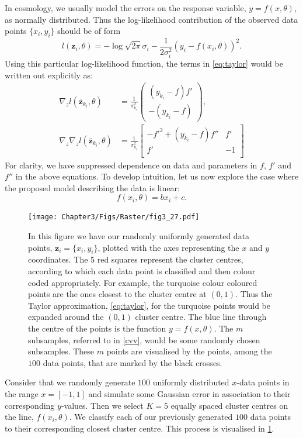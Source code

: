 In cosmology, we usually model the errors on the response variable, $y= f(x,\theta)$, as normally distributed. Thus the log-likelihood contribution of the observed data points $\{x_i,y_i \}$ should be of form
%
\begin{equation}
   l (\textbf{z}_{i},\theta) = - \log \sqrt{2\pi} \sigma_i -\frac{1}{2\sigma_i^2}(y_i-f(x_i, \theta))^2.
\end{equation}
%
Using this particular log-likelihood function, the terms in \cref{eq:taylor} would be written out explicitly as:
%
\begin{align}
   \nabla_z l(\bar{\textbf{z}}_{k_{i}},\theta) &= \frac{1}{\sigma_{k_{i}}^2} \begin{pmatrix}(y_{k_{i}}-f)f'\\-(y_{k_{i}}-f)\end{pmatrix},\\
   \nabla_z \nabla_z l(\bar{\textbf{z}}_{k_{i}},\theta) &=  \frac{1}{\sigma_{k_{i}}^2} \begin{bmatrix}
-f'^2+(y_{k_{i}}-f)f'' & f' \\
f' & -1 \\
\end{bmatrix}
\end{align}
%
For clarity, we have suppressed dependence on data and parameters in $f$, $f'$ and $f''$ in the above equations. To develop intuition, let us now explore the case where the proposed model describing the data is linear:
\begin{equation}
    f(x_i,\theta) = bx_i+ c.
\label{eq:strt}
\end{equation}
\begin{figure} 
\centering    
\texttt{[image: Chapter3/Figs/Raster/fig3\_27.pdf]}
\caption{In this figure we have our randomly uniformly generated data points, $\textbf{z}_i= \{x_i,y_i \}$, plotted with the axes representing the $x$ and $y$ coordinates. The 5 red squares represent the cluster centres, according to which each data point is classified and then colour coded appropriately. For example, the turquoise colour coloured points are the ones closest to the cluster centre at $(0,1)$. Thus the Taylor approximation, \cref{eq:taylor}, for the turquoise points would be expanded around the $(0,1)$ cluster centre. The blue line through the centre of the points is the function $y=f(x,\theta)$. The $m$ subsamples, referred to in \cref{cvv}, would be some randomly chosen subsamples. These $m$ points are visualised by the points, among the $100$ data points, that are marked by the black crosses.}
\label{fig:one}
\end{figure}
Consider that we randomly generate $100$ uniformly distributed $x$-data points in the range $x=[-1,1]$ and simulate some Gaussian error in association to their corresponding $y$-values. Then we select $K=5$ equally spaced cluster centres on the line, $f(x_{i}, \theta )$. We classify each of our previously generated $100$ data points to their corresponding closest cluster centre. This process is visualised in \cref{fig:one}.


